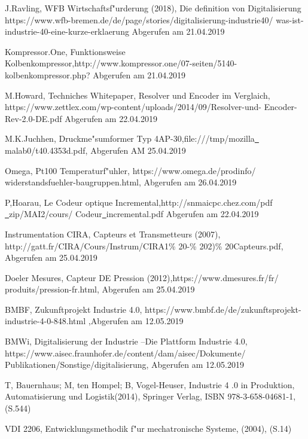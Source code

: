 \begin{thebibliography}{99}


J.Ravling, WFB Wirtschaftsf"urderung (2018), Die definition von Digitalisierung 
https://www.wfb-bremen.de/de/page/stories/digitalisierung-industrie40/
was-ist-industrie-40-eine-kurze-erklaerung Abgerufen am 21.04.2019

Kompressor.One, Funktionsweise 
Kolbenkompressor,http://www.kompressor.one/07-seiten/5140-
kolbenkompressor.php? Abgerufen am 21.04.2019

M.Howard, Techniches Whitepaper, Resolver und Encoder im Verglaich, 
https://www.zettlex.com/wp-content/uploads/2014/09/Resolver-und-
Encoder-Rev-2.0-DE.pdf Abgerufen am 22.04.2019

M.K.Juchhen, Druckme"sumformer Typ 4AP-30,file:///tmp/mozilla\underline{\ } 
malab0/t40.4353d.pdf, Abgerufen AM 25.04.2019

Omega, Pt100 Temperaturf"uhler, https://www.omega.de/prodinfo/
widerstandsfuehler-baugruppen.html, Abgerufen am 26.04.2019

P,Hoarau, Le Codeur optique Incremental,http://snmaicpc.chez.com/pdf
\underline{\ }zip/MAI2/cours/
Codeur\underline{\ }incremental.pdf Abgerufen am 22.04.2019

Instrumentation CIRA, Capteurs et Transmetteurs (2007), 
http://gatt.fr/CIRA/Cours/Instrum/CIRA1\% 20-\% 202)\% 20Capteurs.pdf,
Abgerufen am 25.04.2019

Doeler Mesures, Capteur DE Pression (2012),https://www.dmesures.fr/fr/
produits/pression-fr.html, Abgerufen am 25.04.2019


BMBF, Zukunftprojekt Industrie 4.0, https://www.bmbf.de/de/zukunftsprojekt-
industrie-4-0-848.html ,Abgerufen am 12.05.2019


BMWi, Digitalisierung der Industrie –Die Plattform Industrie 4.0, 
https://www.aisec.fraunhofer.de/content/dam/aisec/Dokumente/
Publikationen/Sonstige/digitalisierung, 
Abgerufen am 12.05.2019


T, Bauernhaus; M, ten Hompel; B, Vogel-Heuser, 
Industrie 4 .0 in Produktion, Automatisierung und Logistik(2014), 
Springer Verlag, ISBN 978-3-658-04681-1,(S.544)

VDI 2206, Entwicklungsmethodik f"ur mechatronische Systeme, (2004), (S.14)


\end{thebibliography}
